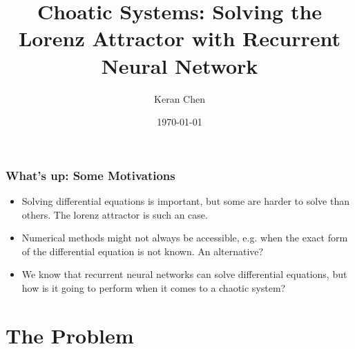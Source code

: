 \documentclass{beamer}
\title{Choatic Systems: Solving the Lorenz Attractor with Recurrent Neural Network}
\author{Keran Chen}
\institute{University of Oslo}
\date{\today}
\begin{document}
\begin{frame}
  \titlepage
\end{frame}


\begin{frame}[t]
	\frametitle{What's up: Some Motivations}
	\begin{itemize}
		\item Solving differential equations is important, but some are harder to solve than others. The lorenz attractor is such an case.
		\item Numerical methods might not always be accessible, e.g. when the exact form of the differential equation is not known. An alternative?
		\item We know that recurrent neural networks can solve differential equations, but how is it going to perform when it comes to a chaotic system?
	\end{itemize}
	
\end{frame}
\section{The Problem}
\end{document}

